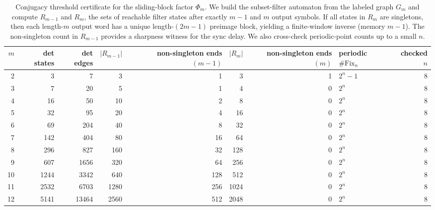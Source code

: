 \begin{table}[H]
\centering
\scriptsize
\setlength{\tabcolsep}{6pt}
\caption{Conjugacy threshold certificate for the sliding-block factor $\Phi_m$. We build the subset-filter automaton from the labeled graph $G_m$ and compute $R_{m-1}$ and $R_m$, the sets of reachable filter states after exactly $m-1$ and $m$ output symbols. If all states in $R_m$ are singletons, then each length-$m$ output word has a unique length-$(2m-1)$ preimage block, yielding a finite-window inverse (memory $m-1$). The non-singleton count in $R_{m-1}$ provides a sharpness witness for the sync delay. We also cross-check periodic-point counts up to a small $n$.}
\label{tab:phi_m_conjugacy_threshold}
\begin{tabular}{r r r r r r r l r}
\toprule
$m$ & det states & det edges & $|R_{m-1}|$ & non-singleton ends $(m-1)$ & $|R_m|$ & non-singleton ends $(m)$ & periodic $\#\mathrm{Fix}_n$ & checked $n$\\
\midrule
2 & 3 & 7 & 3 & 1 & 3 & 1 & $2^n-1$ & 8\\
3 & 7 & 20 & 5 & 1 & 4 & 0 & $2^n$ & 8\\
4 & 16 & 50 & 10 & 2 & 8 & 0 & $2^n$ & 8\\
5 & 32 & 95 & 20 & 4 & 16 & 0 & $2^n$ & 8\\
6 & 69 & 204 & 40 & 8 & 32 & 0 & $2^n$ & 8\\
7 & 142 & 404 & 80 & 16 & 64 & 0 & $2^n$ & 8\\
8 & 296 & 827 & 160 & 32 & 128 & 0 & $2^n$ & 8\\
9 & 607 & 1656 & 320 & 64 & 256 & 0 & $2^n$ & 8\\
10 & 1244 & 3342 & 640 & 128 & 512 & 0 & $2^n$ & 8\\
11 & 2532 & 6703 & 1280 & 256 & 1024 & 0 & $2^n$ & 8\\
12 & 5141 & 13464 & 2560 & 512 & 2048 & 0 & $2^n$ & 8\\
\bottomrule
\end{tabular}
\end{table}
